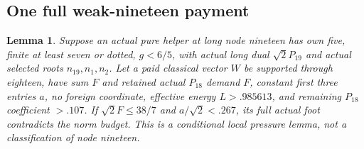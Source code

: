 \documentclass[11pt]{article}
\newtheorem{lemma}[theorem]{Lemma}
\theoremstyle{definition}
\theoremstyle{remark}
\begin{document}
\subsection{One full weak-nineteen payment}
\label{app:tail:weak19}
\begin{lemma}
\label{app:tail:lem:weak19packet}
Suppose an actual pure helper at long node nineteen has own five,
finite at least seven or dotted, $g<6/5$, with actual long dual
$\sqrt2P_{19}$ and actual selected roots $n_{19},n_1,n_2$.
Let a paid classical vector $W$ be supported through eighteen, have
sum $F$ and retained actual $P_{18}$ demand $F$, constant first
three entries $a$, no foreign coordinate,
effective energy $L>.985613$, and remaining $P_{18}$ coefficient
$>.107$. If $\sqrt2F\le38/7$ and $a/\sqrt2<.267$, its full actual
foot contradicts the norm budget. This is a conditional local
pressure lemma, not a classification of node nineteen.
\end{lemma}
\end{document}
